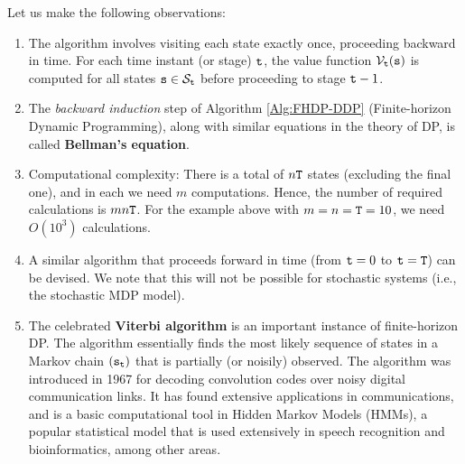 Let us make
the following observations:
\begin{enumerate}
  \item
The algorithm involves visiting each state exactly once, proceeding
backward in time. For each time instant (or stage) ${\tt t}$, the
value function ${\mathcal{V}_{{\tt t}}}({\tt s})$ is computed for all
states ${\tt s} \in {\mathcal{S}_{{\tt t}}}$ before proceeding to stage
${\tt t} - 1$.
  \item
The {\em backward induction} step of Algorithm \ref{Alg:FHDP-DDP} (Finite-horizon Dynamic Programming),
along with similar equations in the theory of DP, is called
\textbf{Bellman's equation}.
  \item
Computational complexity: There is a total of $n{\tt T}$ states
(excluding the final one), and in each we need $m$ computations.
Hence, the number of required calculations is $mn{\tt T}$. For the
example above with $m = n = {\tt T} = 10$, we need $O({10^3})$
calculations.
  \item
A similar algorithm that proceeds forward in time (from ${\tt t} = 0$
to ${\tt t} = {\tt T}$) can be devised. We note that this will not
be possible for stochastic systems (i.e., the stochastic MDP model).
  \item
The celebrated \textbf{Viterbi algorithm} is an important instance
of finite-horizon DP. The algorithm essentially finds the most
likely sequence of states in a Markov chain $({{\tt s}_{{\tt t}}})$
that is partially (or noisily) observed. The algorithm was
introduced in 1967 for decoding convolution codes over noisy digital
communication links. It has found extensive applications in
communications, and is a basic computational tool in Hidden Markov
Models (HMMs), a popular statistical model that is used extensively
in speech recognition and bioinformatics, among other areas.
\end{enumerate}



